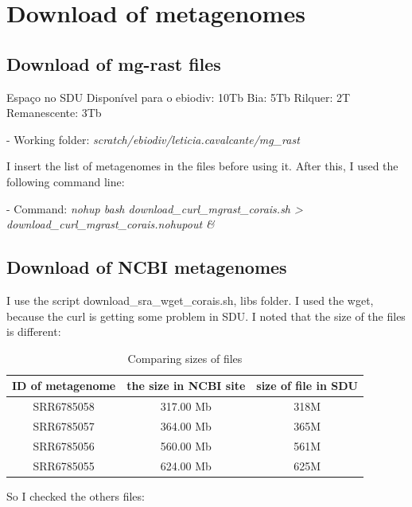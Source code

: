 \documentclass[12pt, a4paper]{report}
\begin{document}
\chapter{Download of metagenomes}
\section{Download of mg-rast files} 
Espaço no SDU
Disponível para o ebiodiv: 10Tb
Bia: 5Tb
Rilquer: 2T
Remanescente: 3Tb

\begin{tcolorbox}[width=6.3in]
 \scriptsize 
 - Working folder: \textit{scratch/ebiodiv/leticia.cavalcante/mg\_rast}
 \end{tcolorbox}

I insert the list of metagenomes in the files before using it. After this, I used the following command line:

\begin{tcolorbox}[width=6.3in]
 \scriptsize 
 - Command: \textit{nohup bash download\_curl\_mgrast\_corais.sh > download\_curl\_mgrast\_corais.nohupout \&}
 \end{tcolorbox}

\section{Download of NCBI metagenomes}
I use the script download\_sra\_wget\_corais.sh, libs folder. I used the wget, because the curl is getting some problem in SDU.
I noted that the size of the files is different:


\begin{table}[!htb]
  \caption{Comparing sizes of files}
  \centering
  \begin{tabular}{ccc}
  \hline 
       ID of metagenome&the size in NCBI site&size of file in SDU\\
  \hline
	SRR6785058&317.00 Mb&318M\\
	SRR6785057&364.00 Mb&365M\\
	SRR6785056&560.00 Mb&561M\\
	SRR6785055&624.00 Mb&625M\\
  \hline
  \end{tabular}
  \label{table2}
 \end{table}

So I checked the others files:
\end{document}
